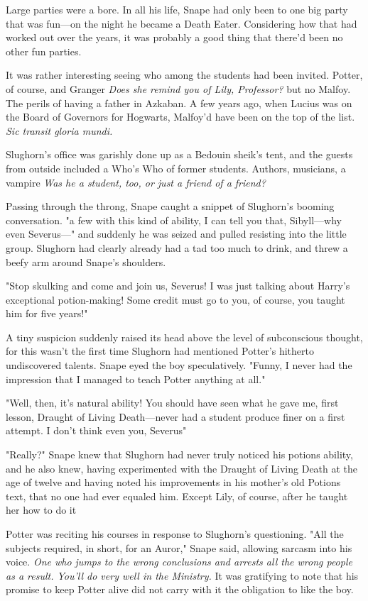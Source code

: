 Large parties were a bore. In all his life, Snape had only been to one big party that was fun—on the night he became a Death Eater. Considering how that had worked out over the years, it was probably a good thing that there'd been no other fun parties.

It was rather interesting seeing who among the students had been invited. Potter, of course, and Granger{\el} \emph{Does she remind you of Lily, Professor?{\el}} but no Malfoy. The perils of having a father in Azkaban. A few years ago, when Lucius was on the Board of Governors for Hogwarts, Malfoy'd have been on the top of the list. \emph{Sic transit gloria mundi.}

Slughorn's office was garishly done up as a Bedouin sheik's tent, and the guests from outside included a Who's Who of former students. Authors, musicians, a vampire{\el} \emph{Was he a student, too, or just a friend of a friend?}

Passing through the throng, Snape caught a snippet of Slughorn's booming conversation. "{\el}a few with this kind of ability, I can tell you that, Sibyll—why even Severus—" and suddenly he was seized and pulled resisting into the little group. Slughorn had clearly already had a tad too much to drink, and threw a beefy arm around Snape's shoulders.

"Stop skulking and come and join us, Severus! I was just talking about Harry's exceptional potion-making! Some credit must go to you, of course, you taught him for five years!"

A tiny suspicion suddenly raised its head above the level of subconscious thought, for this wasn't the first time Slughorn had mentioned Potter's hitherto undiscovered talents. Snape eyed the boy speculatively. "Funny, I never had the impression that I managed to teach Potter anything at all."

"Well, then, it's natural ability! You should have seen what he gave me, first lesson, Draught of Living Death—never had a student produce finer on a first attempt. I don't think even you, Severus{\el}"

"Really?" Snape knew that Slughorn had never truly noticed his potions ability, and he also knew, having experimented with the Draught of Living Death at the age of twelve and having noted his improvements in his mother's old Potions text, that no one had ever equaled him. Except Lily, of course, after he taught her how to do it{\el}

Potter was reciting his courses in response to Slughorn's questioning. "All the subjects required, in short, for an Auror," Snape said, allowing sarcasm into his voice. \emph{One who jumps to the wrong conclusions and arrests all the wrong people as a result. You'll do very well in the Ministry.} It was gratifying to note that his promise to keep Potter alive did not carry with it the obligation to like the boy.

